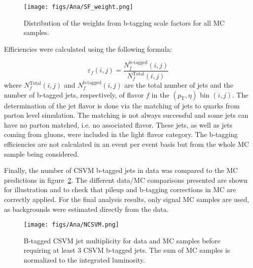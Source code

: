 
\begin{figure}[!Hhtbp]
  \begin{center}
    \texttt{[image: figs/Ana/SF\_weight.png]}
    \caption{Distribution of the weights from b-tagging scale factors for all MC samples.}
    \label{fig:SFweight}
  \end{center}
\end{figure}

Efficiencies were calculated using the following formula:

\begin{equation}
  \label{eq:btaggingeff}
  \varepsilon_f(i,j) = \frac{N_f^\text{b-tagged}(i,j)}{N_f^\text{Total}(i,j)}
\end{equation} where $ N_f^\text{Total}(i,j) $ and $ N_f^\text{b-tagged}(i,j) $ are the total number of jets and the number of b-tagged jets, respectively, of flavor $ f $ in the $ (p_\text{T},\eta) $ bin $ (i,j) $. The determination of the jet flavor is done via the matching of jets to quarks from parton level simulation. The matching is not always successful and some jets can have no parton matched, i.e. no associated flavor. These jets, as well as jets coming from gluons, were included in the light flavor category. The b-tagging efficiencies are not calculated in an event per event basis but from the whole MC sample being considered.

Finally, the number of CSVM b-tagged jets in data was compared to the MC predictions in figure~\ref{fig:Nb}. The different data/MC comparisons presented are shown for illustration and to check that pileup and b-tagging corrections in MC are correctly applied. For the final analysis results, only signal MC samples are used, as backgrounds were estimated directly from the data.

\begin{figure}[!Hhtbp]
  \begin{center}
    \texttt{[image: figs/Ana/NCSVM.png]}
    \caption{B-tagged CSVM jet multiplicity for data and MC samples before requiring at least 3 CSVM b-tagged jets. The sum of MC samples is normalized to the integrated luminosity.}
    \label{fig:Nb}
  \end{center}
\end{figure}

